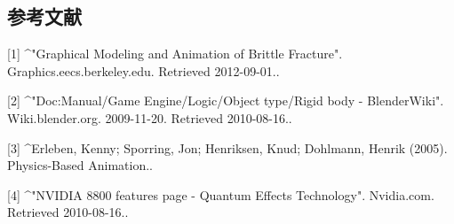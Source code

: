 \subsection{参考文献}
[1]
^"Graphical Modeling and Animation of Brittle Fracture". Graphics.eecs.berkeley.edu. Retrieved 2012-09-01..

[2]
^"Doc:Manual/Game Engine/Logic/Object type/Rigid body - BlenderWiki". Wiki.blender.org. 2009-11-20. Retrieved 2010-08-16..

[3]
^Erleben, Kenny; Sporring, Jon; Henriksen, Knud; Dohlmann, Henrik (2005). Physics-Based Animation..

[4]
^"NVIDIA 8800 features page - Quantum Effects Technology". Nvidia.com. Retrieved 2010-08-16..